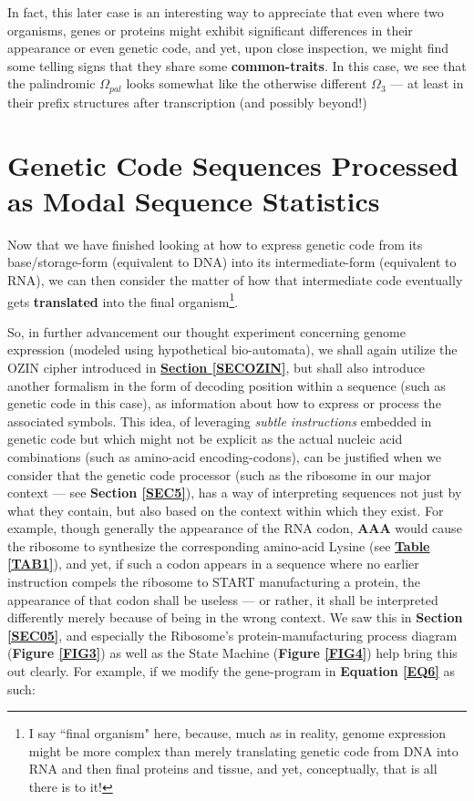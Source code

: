 \documentclass[a4paper, 18pt]{book} %
\begin{document}
In fact, this later case is an interesting way to appreciate that even where two organisms, genes or proteins might exhibit significant differences in their appearance or even genetic code, and yet, upon close inspection, we might find some telling signs that they share some \textbf{common-traits}. In this case, we see that the palindromic $\Omega_{pal}$ looks somewhat like the otherwise different $\Omega_{3}$ --- at least in their prefix structures after transcription (and possibly beyond!)

\section{Genetic Code Sequences Processed as Modal Sequence Statistics}
\label{SECGENEXPRE}

Now that we have finished looking at how to express genetic code from its base/storage-form (equivalent to DNA) into its intermediate-form (equivalent to RNA), we can then consider the matter of how that intermediate code eventually gets \textbf{translated} into the final organism\footnote{I say ``final organism" here, because, much as in reality, genome expression might be more complex than merely translating genetic code from DNA into RNA and then final proteins and tissue, and yet, conceptually, that is all there is to it!}.

So, in further advancement our thought experiment concerning genome expression (modeled using hypothetical bio-automata), we shall again utilize the OZIN cipher introduced in \textbf{\hyperref[SECOZIN]{Section \ref{SECOZIN}}}, but shall also introduce another formalism in the form of decoding position within a sequence (such as genetic code in this case), as information about how to express or process the associated symbols. This idea, of leveraging \textit{subtle instructions} embedded in genetic code but which might not be explicit as the actual nucleic acid combinations (such as amino-acid encoding-codons), can be justified when we consider that the genetic code processor (such as the ribosome in our major context --- see \textbf{Section \ref{SEC5}}), has a way of interpreting sequences not just by what they contain, but also based on the context within which they exist. For example, though generally the appearance of the RNA codon, \textbf{AAA} would cause the ribosome to synthesize the corresponding amino-acid Lysine (see \textbf{\hyperref[TAB1]{Table \ref{TAB1}}}), and yet, if such a codon appears in a sequence where no earlier instruction compels the ribosome to START manufacturing a protein, the appearance of that codon shall be useless --- or rather, it shall be interpreted differently merely because of being in the wrong context. We saw this in \textbf{Section \ref{SEC05}}, and especially the Ribosome's protein-manufacturing process diagram (\textbf{Figure \ref{FIG3}}) as well as the State Machine (\textbf{Figure \ref{FIG4}}) help bring this out clearly. For example, if we modify the gene-program  in \textbf{Equation \ref{EQ6}} as such:
\end{document}
